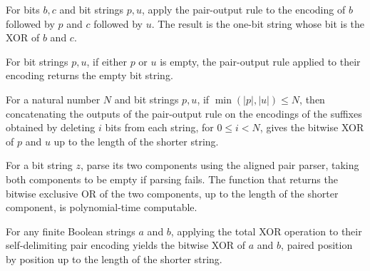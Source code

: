 \begin{theorem}
\label{Complexity.xorPairEmit_cons}
\leanok
{}
For bits $b,c$ and bit strings $p,u$, apply the pair-output rule to the encoding of $b$
followed by $p$ and $c$ followed by $u$. The result is the one-bit string whose bit is
the XOR of $b$ and $c$.
\end{theorem}

\begin{theorem}
\label{Complexity.xorPairEmit_nil}
\leanok
{}
For bit strings $p,u$, if either $p$ or $u$ is empty, the pair-output rule applied to
their encoding returns the empty bit string.
\end{theorem}

\begin{theorem}
\label{Complexity.xorPair_output}
\leanok
{}
For a natural number $N$ and bit strings $p,u$, if $\min(|p|,|u|)\le N$, then
concatenating the outputs of the pair-output rule on the encodings of the suffixes
obtained by deleting $i$ bits from each string, for $0\le i<N$, gives the bitwise XOR of
$p$ and $u$ up to the length of the shorter string.
\end{theorem}

\begin{theorem}
\label{Complexity.polyTimeComputable_xorD}
\leanok
{}
For a bit string $z$, parse its two components using the aligned pair parser, taking
both components to be empty if parsing fails. The function that returns the bitwise
exclusive OR of the two components, up to the length of the shorter component, is
polynomial-time computable.
\end{theorem}

\begin{theorem}
\label{Complexity.xorD_pairEncode}
\leanok
{}
For any finite Boolean strings $a$ and $b$, applying the total XOR operation to their
self-delimiting pair encoding yields the bitwise XOR of $a$ and $b$, paired position by
position up to the length of the shorter string.
\end{theorem}
